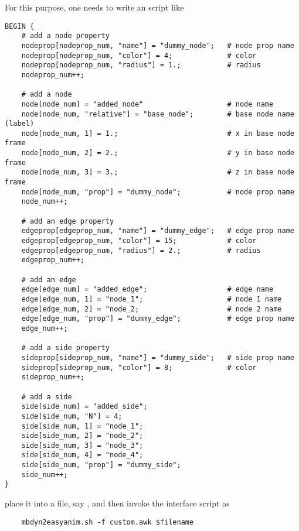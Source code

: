 For this purpose, one needs to write an  script like
\begin{verbatim}
BEGIN {
    # add a node property
    nodeprop[nodeprop_num, "name"] = "dummy_node";   # node prop name
    nodeprop[nodeprop_num, "color"] = 4;             # color
    nodeprop[nodeprop_num, "radius"] = 1.;           # radius
    nodeprop_num++;

    # add a node
    node[node_num] = "added_node"                    # node name
    node[node_num, "relative"] = "base_node";        # base node name (label)
    node[node_num, 1] = 1.;                          # x in base node frame
    node[node_num, 2] = 2.;                          # y in base node frame
    node[node_num, 3] = 3.;                          # z in base node frame
    node[node_num, "prop"] = "dummy_node";           # node prop name
    node_num++;

    # add an edge property
    edgeprop[edgeprop_num, "name"] = "dummy_edge";   # edge prop name
    edgeprop[edgeprop_num, "color"] = 15;            # color
    edgeprop[edgeprop_num, "radius"] = 2.;           # radius
    edgeprop_num++;

    # add an edge
    edge[edge_num] = "added_edge";                   # edge name
    edge[edge_num, 1] = "node_1";                    # node 1 name
    edge[edge_num, 2] = "node_2;                     # node 2 name
    edge[edge_num, "prop"] = "dummy_edge";           # edge prop name
    edge_num++;

    # add a side property
    sideprop[sideprop_num, "name"] = "dummy_side";   # side prop name
    sideprop[sideprop_num, "color"] = 8;             # color
    sideprop_num++;

    # add a side
    side[side_num] = "added_side";
    side[side_num, "N"] = 4;
    side[side_num, 1] = "node_1";
    side[side_num, 2] = "node_2";
    side[side_num, 3] = "node_3";
    side[side_num, 4] = "node_4";
    side[side_num, "prop"] = "dummy_side";
    side_num++;
}
\end{verbatim}
place it into a file, say ,
and then invoke the interface script as
\begin{verbatim}
    mbdyn2easyanim.sh -f custom.awk $filename
\end{verbatim}



\begin{comment} %
\section{Altair MotionView}
Support for Altair's MotionView must be enabled at configure time, 
by using the directive \kw{--enable-motionview};
the specific client libraries are required.
It should generate a binary model and results file compatible
with MotionView.
It is activated by the directive
\begin{verbatim}
    output results : motion view ;
\end{verbatim}
No special parameters are available at the moment; 
this interface is under development.
\end{comment} %
